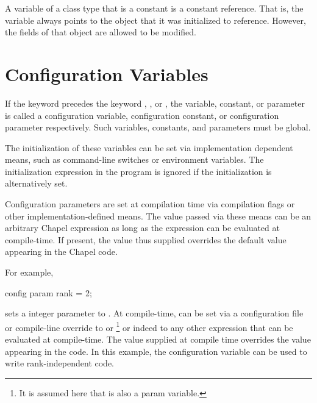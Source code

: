 A variable of a class type that is a constant is a constant reference.
That is, the variable always
points to the object that it was initialized to reference.
However, the fields of that object are allowed to be modified.

\section{Configuration Variables}
\label{Configuration_Variables}

If the keyword  precedes the
keyword , , or , the variable,
constant, or parameter is called a configuration variable,
configuration constant, or configuration parameter respectively.  Such
variables, constants, and parameters must be global.

The initialization of these variables can be set via implementation
dependent means, such as command-line switches or environment
variables.  The initialization expression in the program is ignored if
the initialization is alternatively set.

Configuration parameters are set at compilation time via compilation
flags or other implementation-defined means.  The value passed via
these means can be an arbitrary Chapel expression as long as the
expression can be evaluated at compile-time.  If present, the value thus
supplied overrides the default value appearing in the Chapel code.

\begin{example}
For example,
\begin{chapel}
config param rank = 2;
\end{chapel}
sets a integer parameter  to .  At
compile-time,  can be set via a configuration file or compile-line
override to  or \footnote{It is assumed here that  is
also a param variable.} or indeed to any other expression
that can be evaluated at compile-time.  The value supplied at compile time
overrides the value  appearing in the code.  In this example, the 
configuration variable can be used to write rank-independent code.
\end{example}
